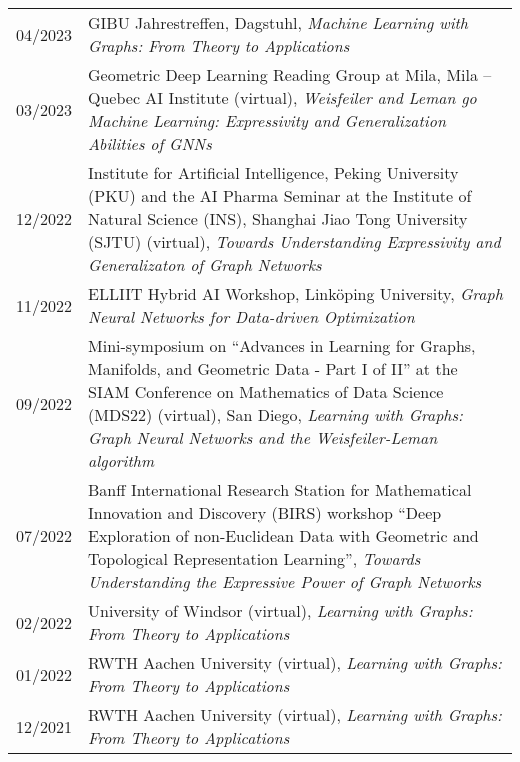 \documentclass[11pt, a4paper, DIV=14, headings=small]{scrartcl}
\begin{document}
\begin{longtabu}{p{2.1cm}p{12.0cm}}
		04/2023 & GIBU Jahrestreffen, Dagstuhl, \emph{Machine Learning with Graphs: From Theory to Applications}                                                                                                                                                                                \\
		03/2023 & Geometric Deep Learning Reading Group at Mila, Mila -- Quebec AI Institute (virtual), \emph{Weisfeiler and Leman go Machine Learning: Expressivity and Generalization Abilities of GNNs}\\
		12/2022 & Institute for Artificial Intelligence, Peking University (PKU) and the AI Pharma Seminar at the Institute of Natural Science (INS), Shanghai Jiao Tong University (SJTU) (virtual), \emph{Towards Understanding Expressivity and Generalizaton of Graph Networks}            \\
		11/2022 & ELLIIT Hybrid AI Workshop, Linköping University, \emph{Graph Neural Networks for Data-driven Optimization}                                                                                                                                                                    \\
		09/2022 & Mini-symposium on ``Advances in Learning for Graphs, Manifolds, and Geometric Data - Part I of II'' at the SIAM Conference on Mathematics of Data Science (MDS22) (virtual), San Diego, \emph{Learning with Graphs: Graph Neural Networks and the Weisfeiler-Leman algorithm} \\
		07/2022 & Banff International Research Station for Mathematical Innovation and Discovery (BIRS) workshop ``Deep Exploration of non-Euclidean Data with Geometric and Topological Representation Learning'',  \emph{Towards Understanding the Expressive Power of Graph Networks}        \\
		02/2022 & University of Windsor (virtual), \emph{Learning with Graphs: From Theory to Applications}                                                                                                                                                                                     \\
		01/2022 & RWTH Aachen University (virtual), \emph{Learning with Graphs: From Theory to Applications}                                                                                                                                                                                    \\
		12/2021 & RWTH Aachen University (virtual), \emph{Learning with Graphs: From Theory to Applications}                                                                                                                                                                                    \\

\end{longtabu}
\end{document}
